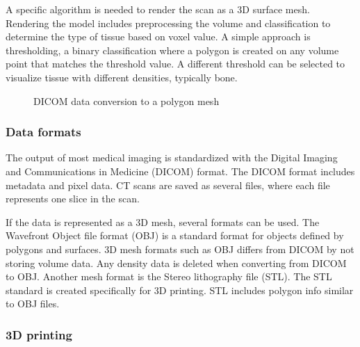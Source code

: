 \documentclass[a4paper]{report}
\begin{document}
A specific algorithm is needed to render the scan as a 3D surface mesh. Rendering the model includes preprocessing the volume and classification to determine the type of tissue based on voxel value. A simple approach is thresholding, a binary classification where a polygon is created on any volume point that matches the threshold value. A different threshold can be selected to visualize tissue with different densities, typically bone\cite{fishman_volume_2006}.

\begin{figure}[h!]
    \centering
	\hfill
  \caption{DICOM data conversion to a polygon mesh}
  \label{dicom}
\end{figure}

\subsubsection{Data formats}

The output of most medical imaging is standardized with the Digital Imaging and Communications in Medicine (DICOM) format\cite{noauthor_dicom_nodate}. The DICOM format includes metadata and pixel data. CT scans are saved as several files, where each file represents one slice in the scan.

If the data is represented as a 3D mesh, several formats can be used. The Wavefront Object file format (OBJ)\cite{obj} is a standard format for objects defined by polygons and surfaces. 3D mesh formats such as OBJ differs from DICOM by not storing volume data. Any density data is deleted when converting from DICOM to OBJ.
Another mesh format is the Stereo lithography file (STL)\cite{stl}. The STL standard is created specifically for 3D printing. STL includes polygon info similar to OBJ files.

\subsubsection{ 3D printing }
\end{document}
